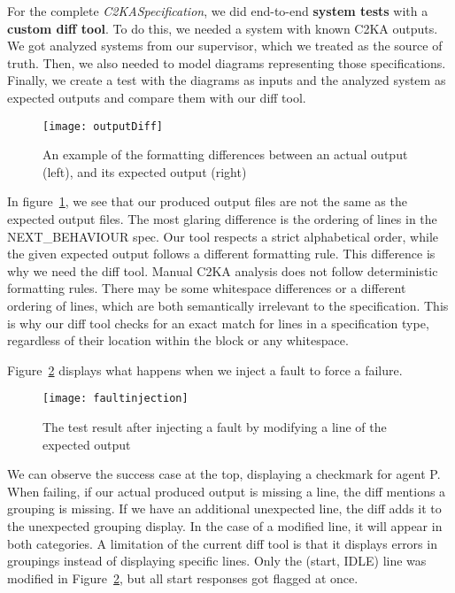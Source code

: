 For the complete \textit{C2KASpecification}, we did end-to-end \textbf{system tests} with a \textbf{custom diff tool}.
To do this, we needed a system with known C2KA outputs.
We got analyzed systems from our supervisor, which we treated as the source of truth.
Then, we also needed to model diagrams representing those specifications.
Finally, we create a test with the diagrams as inputs and the analyzed system as expected outputs and compare them with our diff tool.

\begin{figure}
    \centering
    \texttt{[image: outputDiff]}
    \caption{An example of the formatting differences between an actual output (left), and its expected output (right)}
    \label{fig:out-diff}
\end{figure}
In figure~\ref{fig:out-diff}, we see that our produced output files are not the same as the expected output files.
The most glaring difference is the ordering of lines in the NEXT\_BEHAVIOUR spec.
Our tool respects a strict alphabetical order, while the given expected output follows a different formatting rule.
This difference is why we need the diff tool.
Manual C2KA analysis does not follow deterministic formatting rules.
There may be some whitespace differences or a different ordering of lines, which are both semantically irrelevant to the specification.
This is why our diff tool checks for an exact match for lines in a specification type,
regardless of their location within the block or any whitespace.

Figure~\ref{fig:faultinjection} displays what happens when we inject a fault to force a failure.
\begin{figure}
    \centering
    \texttt{[image: faultinjection]}
    \caption{The test result after injecting a fault by modifying a line of the expected output}
    \label{fig:faultinjection}
\end{figure}

We can observe the success case at the top, displaying a checkmark for agent P\@.
When failing, if our actual produced output is missing a line, the diff mentions a grouping is missing.
If we have an additional unexpected line, the diff adds it to the unexpected grouping display.
In the case of a modified line, it will appear in both categories.
A limitation of the current diff tool is that it displays errors in groupings instead of displaying specific lines.
Only the (start, IDLE) line was modified in Figure~\ref{fig:faultinjection}, but all start responses got flagged at once.

